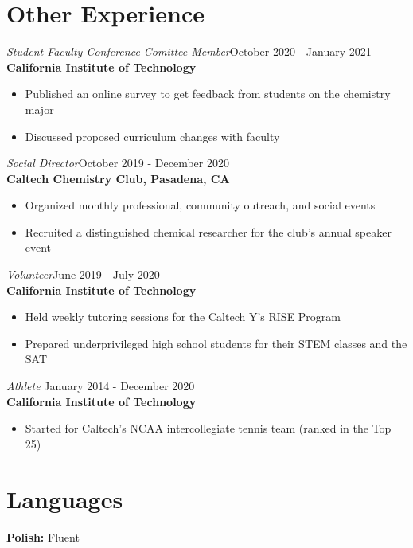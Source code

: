 \documentclass[margin,line]{resume}
\begin{document}
\begin{resume}
\newpage
\section{\mysidestyle Other Experience}
{\sl Student-Faculty Conference Comittee Member}\hfill October 2020 - January 2021\\
\textbf{California Institute of Technology}
\begin{itemize}
\item Published an online survey to get feedback from students on the chemistry major
\item Discussed proposed curriculum changes with faculty
\end{itemize}
{\sl Social Director}\hfill October 2019 - December 2020\\
\textbf{Caltech Chemistry Club, Pasadena, CA}
\begin{itemize}
\item Organized monthly professional, community outreach, and social events
\item Recruited a distinguished chemical researcher for the club's annual speaker event
\end{itemize}
{\sl Volunteer}\hfill June 2019 - July 2020\\
\textbf{California Institute of Technology}
\begin{itemize}
\item Held weekly tutoring sessions for the Caltech Y's RISE Program
\item Prepared underprivileged high school students for their STEM classes and the SAT
\end{itemize}
{\sl Athlete} \hfill January 2014 - December 2020\\
\textbf{California Institute of Technology}
\begin{itemize}
\item Started for Caltech's NCAA intercollegiate tennis team (ranked in the Top 25)
\end{itemize}

\section{\mysidestyle Languages}
\textbf{Polish: }\textnormal{Fluent}


\end{resume}   
\end{document}
